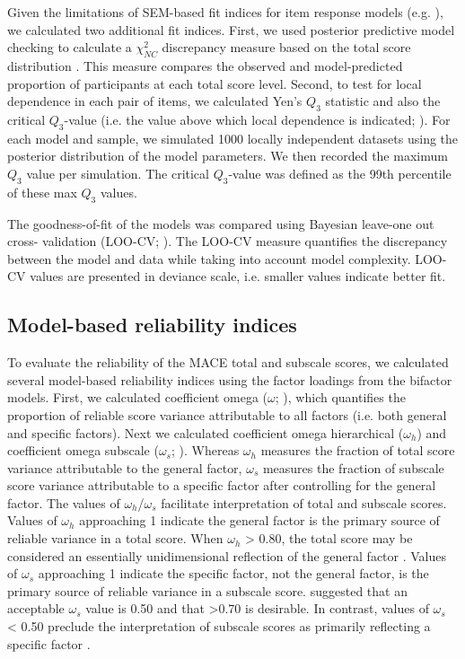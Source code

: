 \documentclass[letterpaper,man,natbib,floatsintext,longtable]{apa6}
\begin{document}
Given the limitations of SEM-based fit indices for item response models (e.g. \citealt{reise2014evaluating}), we calculated two additional fit indices. First, we used posterior predictive model checking to calculate a $\chi^2_{NC}$ discrepancy measure based on the total score distribution \citep{sinharay2006posterior}. This measure compares the observed and model-predicted proportion of participants at each total score level. Second, to test for local dependence in each pair of items, we calculated Yen's $Q_3$ statistic \citep{yen1984effects} and also the critical $Q_3$-value (i.e. the value above which local dependence is indicated; \citealt{christensen2017critical}). For each model and sample, we simulated 1000 locally independent datasets using the posterior distribution of the model parameters. We then recorded the maximum $Q_3$ value per simulation. The critical $Q_3$-value was defined as the 99th percentile of these max $Q_3$ values. 

The goodness-of-fit of the models was compared using Bayesian leave-one out cross- validation (LOO-CV; \citealt{vehtari2017practical}). The LOO-CV measure quantifies the discrepancy between the model and data while taking into account model complexity. LOO-CV values are presented in deviance scale, i.e. smaller values indicate better fit.

\subsection{Model-based reliability indices}

To evaluate the reliability of the MACE total and subscale scores, we calculated several model-based reliability indices using the factor loadings from the bifactor models. First, we calculated coefficient omega ($\omega$; \citealt{mcdonald1999test}), which quantifies the proportion of reliable score variance attributable to all factors (i.e. both general and specific factors). Next we calculated coefficient omega hierarchical ($\omega_h$) and coefficient omega subscale ($\omega_s$;  \citealt{reise2013scoring}). Whereas $\omega_h$ measures the fraction of total score variance attributable to the general factor, $\omega_s$ measures the fraction of subscale score variance attributable to a specific factor after controlling for the general factor. The values of $\omega_h$/$\omega_s$ facilitate interpretation of total and subscale scores. Values of $\omega_h$ approaching 1 indicate the general factor is the primary source of reliable variance in a total score. When $\omega_h$ > 0.80, the total score may be considered an essentially unidimensional reflection of the general factor \citep{rodriguez2016applying}. Values of $\omega_s$ approaching 1 indicate the specific factor, not the general factor, is the primary source of reliable variance in a subscale score. \cite{canivez2016bifactor} suggested that an acceptable $\omega_s$ value is 0.50 and that >0.70 is desirable. In contrast, values of $\omega_s$ < 0.50 preclude the interpretation of subscale scores as primarily reflecting a specific factor \citep{gignac2013bifactor}. 
\end{document}
